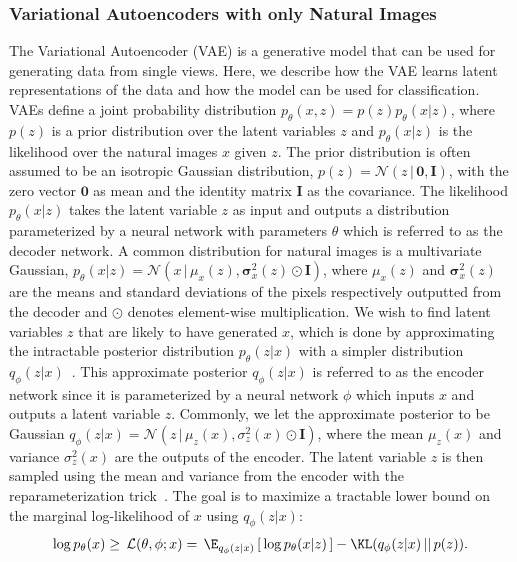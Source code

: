 \subsubsection{Variational Autoencoders with only Natural Images}
\label{sec:vae_with_only_natural_images}
The Variational Autoencoder (VAE) is a generative model that can be used for generating data from single views. Here, we describe how the VAE learns latent representations of the data and how the model can be used for classification.
VAEs define a joint probability distribution $p_{\theta}(x,z) = p(z) p_{\theta}(x|z)$, where $p(z)$ is a prior distribution over the latent variables $z$ and $p_{\theta}(x|z)$ is the likelihood over the natural images $x$ given $z$. The prior distribution is often assumed to be an isotropic Gaussian distribution, $p(z) = \mathcal{N}(z\,|\, \boldsymbol{0}, \mathbf{I})$, with the zero vector $\boldsymbol{0}$ as mean and the identity matrix $\mathbf{I}$ as the covariance.  
The likelihood $p_{\theta}(x|z)$ takes the latent variable $z$ as input and outputs a distribution parameterized by a neural network with parameters $\theta$
which is referred to as the decoder network.
A common distribution for natural images is a multivariate Gaussian, $p_{\theta}(x|z) = \mathcal{N}(x\,|\, \mu_{x}(z), \bm{\sigma}_{x}^2(z) \odot \mathbf{I})$, where $\mu_{x}(z)$ and $\bm{\sigma}_{x}^2(z)$ are the means and standard deviations of the pixels respectively outputted from the decoder and $\odot$ denotes element-wise multiplication. 
We wish to find latent variables $z$ that are likely to have generated $x$, which is done by approximating the intractable posterior distribution $p_{\theta}(z|x)$ with a simpler distribution $q_{\phi}(z|x)$~\cite{zhang2018advances}. This approximate posterior $q_{\phi}(z|x)$ is referred to as the encoder network since it is parameterized by a neural network $\phi$ which inputs $x$ and outputs a latent variable $z$. Commonly, we let the approximate posterior to be Gaussian
$q_{\phi}(z|x) = \mathcal{N}(z \,|\,\mu_{z}(x), \sigma_{z}^2(x) \odot \mathbf{I})$, where the mean $\mu_{z}(x)$ and variance $\sigma_{z}^2(x)$ are the outputs of the encoder. The latent variable $z$ is then sampled using the mean and variance from the encoder with the reparameterization trick~\cite{kingma2013auto,rezende2014stochastic}. The goal is to maximize a tractable lower bound on the marginal log-likelihood of $x$ using $q_{\phi}(z|x)$:
\begin{align}
\begin{split}\label{eq:vae-loss}
\log p_{\theta}(x) \geq \, \mathcal{L}(\theta, \phi; x) = \, \E_{q_{\phi}(z|x)}\left[\, \log p_{\theta}(x | z) \,\right]  -\KL(q_{\phi}(z|x)\,||\,p(z)) .
\end{split}
\end{align}
